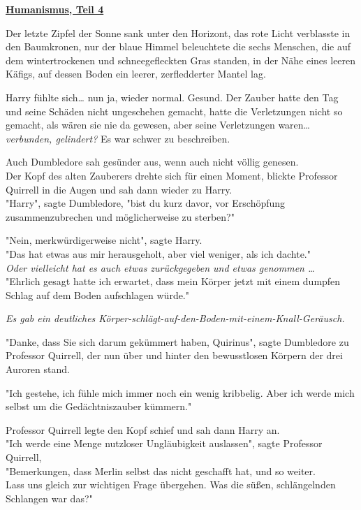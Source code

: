 

\hypertarget{humanismus-teil-4}{%

\textbf{\uline{Humanismus, Teil 4}}

Der letzte Zipfel der Sonne sank unter den Horizont, das rote Licht verblasste in den Baumkronen, nur der blaue Himmel beleuchtete die sechs Menschen, die auf dem wintertrockenen und schneegefleckten Gras standen, in der Nähe eines leeren Käfigs, auf dessen Boden ein leerer, zerfledderter Mantel lag.

Harry fühlte sich… nun ja, wieder normal. Gesund. Der Zauber hatte den Tag und seine Schäden nicht ungeschehen gemacht, hatte die Verletzungen nicht so gemacht, als wären sie nie da gewesen, aber seine Verletzungen waren… \emph{verbunden, gelindert?} Es war schwer zu beschreiben.

Auch Dumbledore sah gesünder aus, wenn auch nicht völlig genesen.\\ Der Kopf des alten Zauberers drehte sich für einen Moment, blickte Professor Quirrell in die Augen und sah dann wieder zu Harry.\\ "Harry", sagte Dumbledore, "bist du kurz davor, vor Erschöpfung zusammenzubrechen und möglicherweise zu sterben?"

"Nein, merkwürdigerweise nicht", sagte Harry.\\ "Das hat etwas aus mir herausgeholt, aber viel weniger, als ich dachte."\\ \emph{Oder vielleicht hat es auch etwas zurückgegeben und etwas genommen …}\\ "Ehrlich gesagt hatte ich erwartet, dass mein Körper jetzt mit einem dumpfen Schlag auf dem Boden aufschlagen würde."

\emph{Es gab ein deutliches Körper-schlägt-auf-den-Boden-mit-einem-Knall-Geräusch.}

"Danke, dass Sie sich darum gekümmert haben, Quirinus", sagte Dumbledore zu Professor Quirrell, der nun über und hinter den bewusstlosen Körpern der drei Auroren stand.

"Ich gestehe, ich fühle mich immer noch ein wenig kribbelig. Aber ich werde mich selbst um die Gedächtniszauber kümmern."

Professor Quirrell legte den Kopf schief und sah dann Harry an.\\ "Ich werde eine Menge nutzloser Ungläubigkeit auslassen", sagte Professor Quirrell,\\ "Bemerkungen, dass Merlin selbst das nicht geschafft hat, und so weiter.\\ Lass uns gleich zur wichtigen Frage übergehen. Was die süßen, schlängelnden Schlangen war das?"

}
